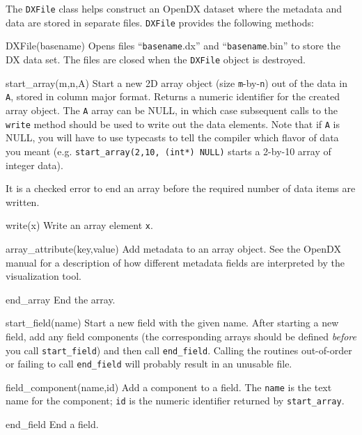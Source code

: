 \documentclass{article}
\newenvironment{codelist}[1][\quad]%
  {\begin{list}{}{%
   \settowidth{\labelwidth}{\texttt{#1}\hfil}%
   \setlength{\leftmargin}{\labelwidth}%
   \addtolength{\leftmargin}{\labelsep}%
   \addtolength{\leftmargin}{\parindent}%
   \renewcommand{\makelabel}[1]{\texttt{##1}}}}%
  {\end{list}}
\newcommand{\ttt}[1]{\texttt{#1}}
\begin{document}
The \ttt{DXFile} class helps construct an OpenDX dataset where the
metadata and data are stored in separate files.  \ttt{DXFile}
provides the following methods:
\begin{codelist}

 \item[DXFile(basename)]
   Opens files ``\ttt{basename}.dx'' and ``\ttt{basename}.bin''
   to store the DX data set.  The files are closed when the
   \ttt{DXFile} object is destroyed.

 \item[start\_array(m,n,A)]
   Start a new 2D array object (size \ttt{m}-by-\ttt{n}) out of the
   data in \ttt{A}, stored in column major format.  Returns a numeric
   identifier for the created array object.  The \ttt{A} array can be
   NULL, in which case subsequent calls to the \ttt{write} method
   should be used to write out the data elements.  Note that if
   \ttt{A} is NULL, you will have to use typecasts to tell the
   compiler which flavor of data you meant
   (e.g. \ttt{start\_array(2,10, (int*) NULL)} starts a 2-by-10 array
   of integer data).

   It is a checked error to end an array before the required number of
   data items are written.

 \item[write(x)]
   Write an array element \ttt{x}.

 \item[array\_attribute(key,value)]
   Add metadata to an array object.  See the OpenDX manual for a
   description of how different metadata fields are interpreted by the
   visualization tool.

 \item[end\_array]
   End the array.

 \item[start\_field(name)]
   Start a new field with the given name.  After starting a new field,
   add any field components (the corresponding arrays should be
   defined \emph{before} you call \ttt{start\_field}) and then call
   \ttt{end\_field}.  Calling the routines out-of-order or failing
   to call \ttt{end\_field} will probably result in an unusable file.

 \item[field\_component(name,id)]
   Add a component to a field.  The \ttt{name} is the text name for
   the component; \ttt{id} is the numeric identifier returned by
   \ttt{start\_array}.

 \item[end\_field]
   End a field.


\end{codelist}
\end{document}
